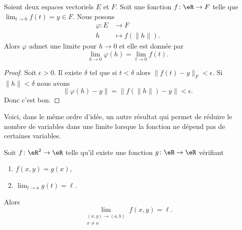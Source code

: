 \begin{lemma}
    Soient deux espaces vectoriels \( E\) et \( F\). Soit une fonction \( f\colon \eR\to F\) telle que \( \lim_{t\to 0} f(t)=y\in F\). Nous posons 
    \begin{equation}
        \begin{aligned}
            \varphi\colon E&\to F \\
            h&\mapsto f(\| h \|). 
        \end{aligned}
    \end{equation}
    Alors \( \varphi\) admet une limite pour \( h\to 0\) et elle est donnée par
    \begin{equation}
        \lim_{h\to 0} \varphi(h)=\lim_{t\to 0} f(t).
    \end{equation}
\end{lemma}

\begin{proof}
    Soit \( \epsilon>0\). Il existe \( \delta\) tel que si \( t<\delta\) alors \( \| f(t)-y \|_F<\epsilon\). Si \( \| h \|<\delta\) nous avons
    \begin{equation}
        \| \varphi(h)-y \|=\| f(\| h \|)-y \|<\epsilon.
    \end{equation}
    Donc c'est bon.
\end{proof}

Voici, dans le même ordre d'idée, un autre résultat qui permet de réduire le nombre de variables dans une limite lorsque la fonction ne dépend pas de certaines variables.

\begin{lemma}        \label{LEMooYLIHooFBQyzC}
    Soit \( f\colon \eR^2\to \eR\) telle qu'il existe une fonction \( g\colon \eR\to \eR\) vérifiant
    \begin{enumerate}
        \item
            \( f(x,y)=g(x)\),
        \item
            \( \lim_{t\to a} g(t)=\ell\).
    \end{enumerate}
    Alors
    \begin{equation}
        \lim_{\substack{(x,y)\to(a,b)\\x\neq a}} f(x,y)=\ell.
    \end{equation}
\end{lemma}

